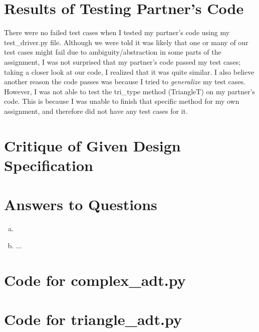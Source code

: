 \documentclass[12pt]{article}
\begin{document}
\section{Results of Testing Partner's Code}

There were no failed test cases when I tested my partner's code using my test\_driver.py file. Although we were told it was likely that one or many of our test cases might fail due to ambiguity/abstraction in some parts of the assignment, I was not surprised that my partner's code passed my test cases; taking a closer look at our code, I realized that it was quite similar. I also believe another reason the code passes was because I tried to \emph{generalize} my test cases. However, I was not able to test the tri\_type method (TriangleT) on my partner's code. This is because I was unable to finish that specific method for my own assignment, and therefore did not have any test cases for it. 

\section{Critique of Given Design Specification}



\section{Answers to Questions}

\begin{enumerate}[(a)]

\item 
\item ...

\end{enumerate}

\newpage

\lstset{language=Python, basicstyle=\tiny, breaklines=true, showspaces=false,
  showstringspaces=false, breakatwhitespace=true}

\def\thesection{\Alph{section}}

\section{Code for complex\_adt.py}

\noindent 

\newpage

\section{Code for triangle\_adt.py}
\end{document}
